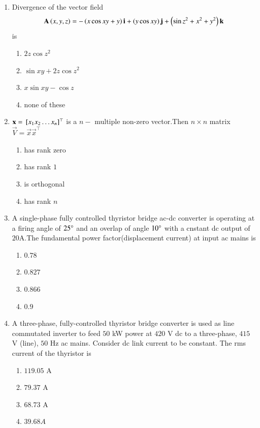 \documentclass[journal,12pt,onecolumn]{IEEEtran}
\theoremstyle{remark}
\begin{document}
\begin{enumerate}
\begin{enumerate}
\end{enumerate}
\item Divergence of the vector field 
\begin{align}
    \mathbf{A}\left(x,y,z\right) = -\left(x \cos{xy}+y\right)\mathbf{i} + \left(y \cos{xy}\right)\mathbf{j} + \left(\sin{z^2}+x^2+y^2\right)\mathbf{k}
\end{align}
is
\begin{enumerate}
    \item $2z \cos{z^2}$
    \item $\sin{xy}+2z\cos{z^2}$
    \item $x\sin{xy}-\cos{z}$
    \item none of these\\
\end{enumerate}
\item $\mathbf{x} = {}\left[x_1 x_2 \dots x_n\right]^\top$ is a $n - $ multiple non-zero vector.Then $n\times n$ matrix $\vec{V} = \vec{x}\vec{x}^\top$
\begin{enumerate}
    \item has rank zero
    \item has rank $1$
    \item is orthogonal
    \item has rank $n$
\end{enumerate}
\item A single-phase fully controlled thyristor bridge ac-dc converter is operating at a firing angle of $25\degree$ and an overlap of angle $10\degree$ with a cnstant dc output of $20\text{A}$.The fundamental power factor(displacement current) at input ac mains is
\begin{enumerate}
    \item $0.78$
    \item $0.827$
    \item $0.866$
    \item $0.9$
\end{enumerate}
\item  A three-phase, fully-controlled thyristor bridge converter is used as line commutated
inverter to feed $50$ kW power at $420$ V dc to a three-phase, $415$ V (line), $50$ Hz ac
mains. Consider dc link current to be constant. The rms current of the thyristor is 
\begin{enumerate}
\item $119.05$ A  \item $79.37$ A \item $68.73$ A 
\item $39.68 A$
\end{enumerate}

\end{enumerate}
\end{document}

